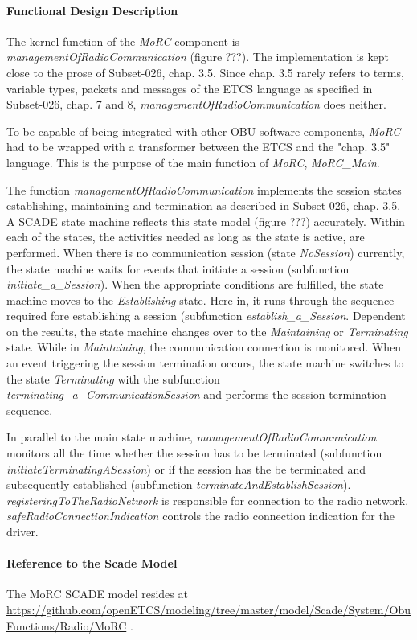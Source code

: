 \paragraph{Functional Design Description}

The kernel function of the \textit{MoRC} component is \textit{managementOfRadioCommunication} (figure ???). The implementation is kept close to the prose of Subset-026, chap. 3.5. Since chap. 3.5 rarely refers to terms, variable types, packets and messages of the ETCS language as specified in Subset-026, chap. 7 and 8, \textit{managementOfRadioCommunication} does neither. 

To be capable of being integrated with other OBU software components, \textit{MoRC} had to be wrapped with a transformer between the ETCS and the "chap. 3.5" language. This is the purpose of the main function of \textit{MoRC}, \textit{MoRC\_Main}. 



The function \textit{managementOfRadioCommunication} implements the session states establishing, maintaining and termination as described in Subset-026, chap. 3.5. A SCADE state machine reflects this state model (figure ???) accurately. Within each of the states, the activities needed as long as the state is active, are performed. When there is no communication session (state \textit{NoSession}) currently, the state machine waits for events that initiate a session (subfunction \textit{initiate\_a\_Session}). When the appropriate conditions are fulfilled, the state machine moves to the \textit{Establishing} state. Here in, it runs through the sequence required fore establishing a session (subfunction \textit{establish\_a\_Session}. Dependent on the results, the state machine changes over to the \textit{Maintaining} or \textit{Terminating} state. While in \textit{Maintaining}, the communication connection is monitored. When an event triggering the session termination occurs, the state machine switches to the state \textit{Terminating} with the subfunction \textit{terminating\_a\_CommunicationSession} and performs the session termination sequence. 

In parallel to the main state machine, \textit{managementOfRadioCommunication} monitors all the time whether the session has to be terminated (subfunction \textit{initiateTerminatingASession}) or if the session has the be terminated and subsequently established (subfunction \textit{terminateAndEstablishSession}). \textit{registeringToTheRadioNetwork} is responsible for connection to the radio network. \textit{safeRadioConnectionIndication} controls the radio connection indication for the driver.


\paragraph{Reference to the Scade Model}

The MoRC SCADE model resides at \url{https://github.com/openETCS/modeling/tree/master/model/Scade/System/ObuFunctions/Radio/MoRC} .






